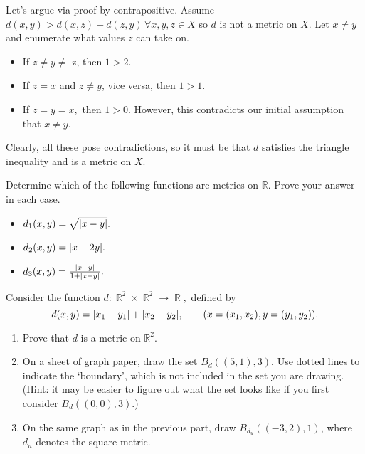 \documentclass[12pt,letterpaper,boxed]{hmcpset}
\DeclarePairedDelimiter\abs{\lvert}{\rvert}
\DeclareMathOperator{\R}{\mathbb{R}}
\begin{document}
\begin{solution}
Let's argue via proof by contrapositive. Assume $d(x, y) > d(x, z) + d(z, y) \, \forall x, y, z \in X$ so $d$ is not a metric on $X.$ Let $x \neq y$ and enumerate what values $z$ can take on. 
\vspace{-2mm}
\begin{itemize}
	\itemsep0em
	\item If $z \neq y \neq$ z, then $1 > 2.$
	\item If $z = x$ and $z \neq y$, vice versa, then $1 > 1.$
	\item If $z = y = x,$ then $1 > 0.$ However, this contradicts our initial assumption that $x \neq y.$
\end{itemize}
Clearly, all these pose contradictions, so it must be that $d$ satisfies the triangle inequality and is a metric on $X$.

\end{solution}

\begin{problem}[Exercise 2.4.]
Determine which of the following functions are metrics on $\mathbb{R}$. Prove your answer in each case.
\vspace{-2mm}
\begin{itemize}
	\itemsep0em
	\item $d_1(x,y)=\sqrt{\abs{x - y}}.$
	\item $d_2(x,y)=\abs{x - 2y}.$
	\item $d_3(x,y)=\frac{\abs{x - y}}{1 + \abs{x - y}}.$
\end{itemize}
\end{problem}
\begin{solution}

\end{solution}

\begin{problem}[Exercise 2.6.]
Consider the function $d: \R^{2} \times \R^{2} \rightarrow \R,$ defined by $$d(x, y) = \abs{x_1 - y_1} + \abs{x_2 - y_2}, \quad \quad (x = (x_1, x_2), y = (y_1, y_2)). $$
\vspace{-2mm}
\begin{enumerate}
	\itemsep0em
	\item Prove that $d$ is a metric on $\mathbb{R}^{2}.$
	\item On a sheet of graph paper, draw the set $B_{d}((5, 1), 3).$ Use dotted lines to indicate the ‘boundary’,
which is not included in the set you are drawing. (Hint: it may be easier to figure out what the
set looks like if you first consider $B_{d}((0, 0), 3).$)
	\item On the same graph as in the previous part, draw $B_{d_{u}}((-3, 2),1)$, where $d_{u}$ denotes the square metric.
\end{enumerate}
\end{problem}
\begin{solution}

\end{solution}
\end{document}
